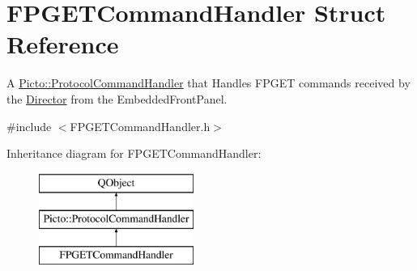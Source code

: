 \hypertarget{struct_f_p_g_e_t_command_handler}{\section{F\-P\-G\-E\-T\-Command\-Handler Struct Reference}
\label{struct_f_p_g_e_t_command_handler}
}


A \hyperlink{struct_picto_1_1_protocol_command_handler}{Picto\-::\-Protocol\-Command\-Handler} that Handles F\-P\-G\-E\-T commands received by the \hyperlink{class_director}{Director} from the Embedded\-Front\-Panel.  




{\ttfamily \#include $<$F\-P\-G\-E\-T\-Command\-Handler.\-h$>$}

Inheritance diagram for F\-P\-G\-E\-T\-Command\-Handler\-:\begin{figure}[H]
\begin{center}
\leavevmode
\includegraphics[height=3.000000cm]{struct_f_p_g_e_t_command_handler}
\end{center}
\end{figure}
